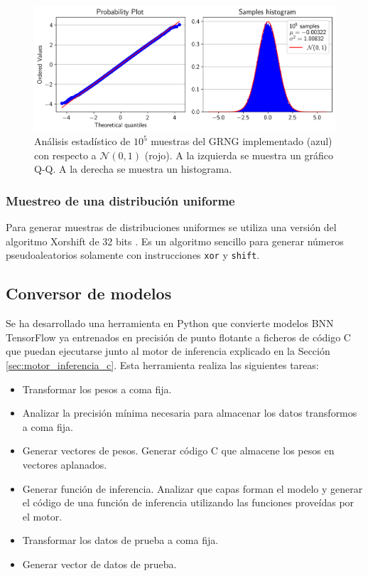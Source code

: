 \begin{figure}[h]
    \centering
    \includegraphics[width=\textwidth]{root/Imagenes/4_bnn_riscv/gaus_aprox.png}
    \caption{Análisis estadístico de $10^5$ muestras del GRNG implementado (azul) con respecto a $\mathcal{N}(0,1)$ (rojo). A la izquierda se muestra un gráfico Q-Q. A la derecha se muestra un histograma.}
    \label{fig:gauss_aprox}
\end{figure}

\subsubsection{Muestreo de una distribución uniforme}

Para generar muestras de distribuciones uniformes se utiliza una versión del algoritmo Xorshift de 32 bits \cite{xorshift}. Es un algoritmo sencillo para generar números pseudoaleatorios solamente con instrucciones \texttt{xor} y \texttt{shift}.

\subsection{Conversor de modelos}

Se ha desarrollado una herramienta en Python que convierte modelos BNN TensorFlow ya entrenados en precisión de punto flotante a ficheros de código C que puedan ejecutarse junto al motor de inferencia explicado en la Sección \ref{sec:motor_inferencia_c}. Esta herramienta realiza las siguientes tareas:

\begin{itemize}
    \item Transformar los pesos a coma fija.
    \item Analizar la precisión mínima necesaria para almacenar los datos transformos a coma fija.
    \item Generar vectores de pesos. Generar código C que almacene los pesos en vectores aplanados.
    \item Generar función de inferencia. Analizar que capas forman el modelo y generar el código de una función de inferencia utilizando las funciones proveídas por el motor.
    \item Transformar los datos de prueba a coma fija.
    \item Generar vector de datos de prueba.
\end{itemize}

